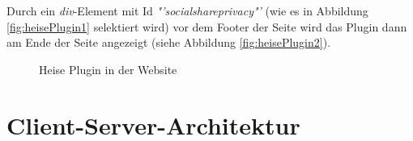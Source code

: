 Durch ein \textit{div}-Element mit Id \textit{"'socialshareprivacy"'} (wie es in Abbildung \vref{fig:heisePlugin1} selektiert wird) vor dem Footer der Seite wird das Plugin dann am Ende der Seite angezeigt (siehe Abbildung \vref{fig:heisePlugin2}).

\begin{figure}[!h]
	\caption{Heise Plugin in der Website}
	\label{fig:heisePlugin2}
\end{figure}

\chapter{Client-Server-Architektur}
\label{Client-Server-Architektur}

